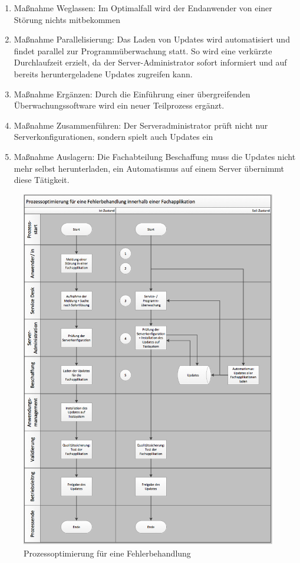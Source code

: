 \begin{enumerate}
	\item Maßnahme Weglassen: Im Optimalfall wird der Endanwender von einer Störung nichts mitbekommen
	\item Maßnahme Parallelisierung: Das Laden von Updates wird automatisiert und findet parallel zur Programmüberwachung statt. So wird eine verkürzte Durchlaufzeit erzielt, da der Server-Administrator sofort informiert und auf bereits heruntergeladene Updates zugreifen kann.
	\item Maßnahme Ergänzen: Durch die Einführung einer übergreifenden Überwachungssoftware wird ein neuer Teilprozess ergänzt.
	\item Maßnahme Zusammenführen: Der Serveradministrator prüft nicht nur Serverkonfigurationen, sondern spielt auch Updates ein
	\item Maßnahme Auslagern: Die Fachabteilung Beschaffung muss die Updates nicht mehr selbst herunterladen, ein Automatismus auf einem Server übernimmt diese Tätigkeit.
\end{enumerate}


\begin{figure}[h!]
	\centering
	\includegraphics[width=13cm]{kapitel/gruppe1_2/bilder/prozessoptimierung} 
	\caption{Prozessoptimierung für eine Fehlerbehandlung}
	\label{fig_prozessoptimierung}
\end{figure}

